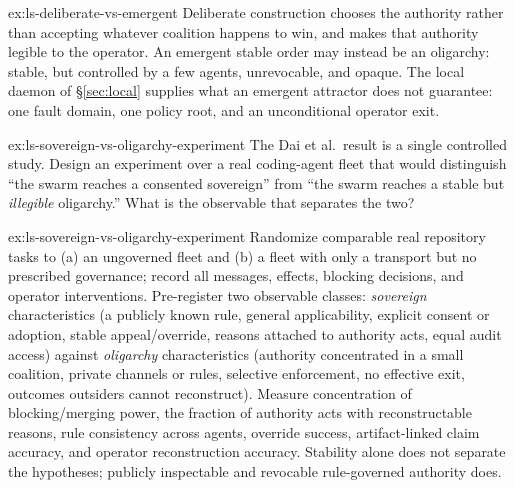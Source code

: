 \documentclass[11pt,a4paper]{article}
\theoremstyle{definition}
\theoremstyle{plain}
\begin{document}
\begin{pdsolution}{ex:ls-deliberate-vs-emergent}
Deliberate construction chooses the authority rather than accepting whatever coalition happens to win, and makes that authority legible to the operator. An emergent stable order may instead be an oligarchy: stable, but controlled by a few agents, unrevocable, and opaque. The local daemon of \S\ref{sec:local} supplies what an emergent attractor does not guarantee: one fault domain, one policy root, and an unconditional operator exit.
\end{pdsolution}
\begin{pdexercise}[kind=Open,rating=3]{ex:ls-sovereign-vs-oligarchy-experiment}
The Dai et al.\ result is a single controlled study. Design an
experiment over a real coding-agent fleet that would distinguish ``the swarm reaches
a consented sovereign'' from ``the swarm reaches a stable but \emph{illegible}
oligarchy.'' What is the observable that separates the two?
\end{pdexercise}
\begin{pdsolution}{ex:ls-sovereign-vs-oligarchy-experiment}
Randomize comparable real repository tasks to (a) an ungoverned fleet and (b) a fleet with only a transport but no prescribed governance; record all messages, effects, blocking decisions, and operator interventions. Pre-register two observable classes: \emph{sovereign} characteristics (a publicly known rule, general applicability, explicit consent or adoption, stable appeal/override, reasons attached to authority acts, equal audit access) against \emph{oligarchy} characteristics (authority concentrated in a small coalition, private channels or rules, selective enforcement, no effective exit, outcomes outsiders cannot reconstruct). Measure concentration of blocking/merging power, the fraction of authority acts with reconstructable reasons, rule consistency across agents, override success, artifact-linked claim accuracy, and operator reconstruction accuracy. Stability alone does not separate the hypotheses; publicly inspectable and revocable rule-governed authority does.
\end{pdsolution}

\end{document}
